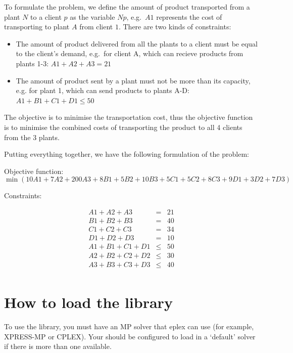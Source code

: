 To formulate the problem, we define the amount of product transported from
a plant $N$ to a client $p$ as the variable $Np$, e.g.\ $A1$
represents the cost of transporting to plant $A$ from client $1$. There are
two kinds of constraints:

\begin{itemize}
\item The amount of product delivered from all the plants to a client must be equal to the
client's demand, e.g.\ for client A, which can recieve products from plants
1-3: \( A1 + A2 + A3 = 21 \)


\item The amount of product sent by a plant must not be more than its
capacity, e.g. for plant 1, which can send products to plants A-D:
\(A1 + B1 + C1 + D1 \leq 50 \)

\end{itemize}

The objective is to minimise the transportation cost, thus the objective
function is to minimise the combined costs of transporting the product to
all 4 clients from the 3 plants.


Putting everything
together, we have the following formulation of the problem:

Objective function:
{\small
\[
\min (10A1 + 7A2 + 200A3 + 8B1 + 5B2 + 10B3 + 5C1 + 5C2 + 8C3 + 9D1 + 3D2 + 7D3) 
\]
}

Constraints:

\begin{eqnarray*}
A1 + A2 + A3 & = & 21\\
B1 + B2 + B3 & = & 40\\
C1 + C2 + C3 & = & 34\\
D1 + D2 + D3 & = & 10\\
A1 + B1 + C1 + D1 & \leq & 50\\
A2 + B2 + C2 + D2 & \leq & 30\\
A3 + B3 + C3 + D3 & \leq & 40\\
\end{eqnarray*}

\section{How to load the library}

To use the library, you must have an MP solver that eplex can use 
(for example,
XPRESS-MP or CPLEX). Your {\eclipse} should be configured to load in a
`default' solver if there is more than one available. 

